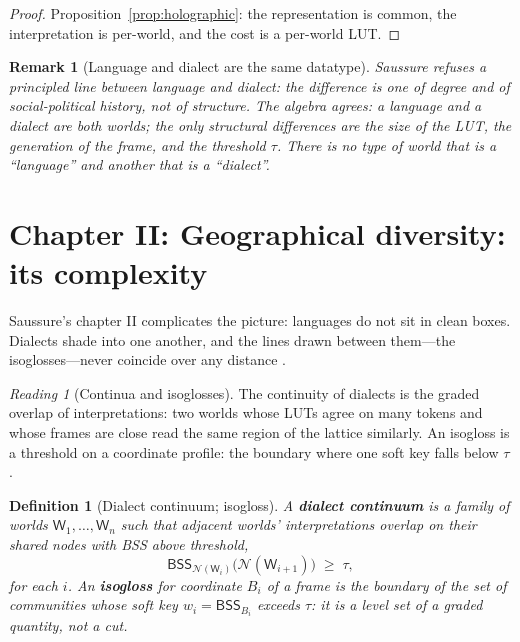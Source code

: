 \documentclass[11pt,a4paper]{article}
\newtheorem{definition}[principle]{Definition}
\newtheorem{remark}[principle]{Remark}
\theoremstyle{remark}
\newtheorem{reading}[principle]{Reading}
\newcommand{\BSS}{\ensuremath{\mathsf{BSS}}}             %
\newcommand{\World}{\ensuremath{\mathsf{W}}}             %
\begin{document}
\begin{proof}
Proposition~\ref{prop:holographic}: the representation is common, the
interpretation is per-world, and the cost is a per-world LUT.
\end{proof}

\begin{remark}[Language and dialect are the same datatype]
Saussure refuses a principled line between language and dialect: the
difference is one of degree and of social-political history, not of
structure. The algebra agrees: a language and a dialect are both worlds; the
only structural differences are the size of the LUT, the generation of the
frame, and the threshold $\tau$. There is no type of world that is a
``language'' and another that is a ``dialect''.
\end{remark}

\section{Chapter II: Geographical diversity: its complexity}
\label{sec:ch2}

Saussure's chapter II complicates the picture: languages do not sit in clean
boxes. Dialects shade into one another, and the lines drawn between them---the
isoglosses---never coincide over any distance \cite[Part IV,
ch.~II]{harris1983}.

\begin{reading}[Continua and isoglosses]
\label{read:complexity}
The continuity of dialects is the graded overlap of interpretations: two
worlds whose LUTs agree on many tokens and whose frames are close read the
same region of the lattice similarly. An isogloss is a threshold on a
coordinate profile: the boundary where one soft key falls below $\tau$.
\end{reading}

\begin{definition}[Dialect continuum; isogloss]
\label{def:isogloss}
A \textbf{dialect continuum} is a family of worlds
$\World_1,\dots,\World_n$ such that adjacent worlds' interpretations overlap
on their shared nodes with BSS above threshold,
\[
  \BSS_{\mathcal{N}(\World_i)}\bigl(\mathcal{N}(\World_{i+1})\bigr)
  \;\ge\; \tau,
\]
for each $i$. An \textbf{isogloss} for coordinate $B_i$ of a frame is the
boundary of the set of communities whose soft key $w_i = \BSS_{B_i}$ exceeds
$\tau$: it is a level set of a graded quantity, not a cut.
\end{definition}
\end{document}
